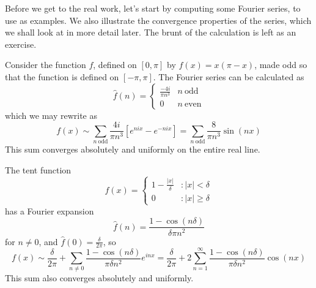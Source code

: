 Before we get to the real work, let's start by computing some Fourier series, to use as examples. We also illustrate the convergence properties of the series, which we shall look at in more detail later. The brunt of the calculation is left as an exercise.

\begin{example}
    Consider the function $f$, defined on $[0,\pi]$ by $f(x) = x(\pi - x)$, made odd so that the function is defined on $[-\pi,\pi]$. The Fourier series can be calculated as
    \[ \hat{f}(n) = \begin{cases} \frac{-4i}{\pi n^3} & n\ \text{odd} \\ 0 & n\ \text{even} \end{cases} \]
    which we may rewrite as
    \[ f(x) \sim \sum_{n\ \text{odd}} \frac{4i}{\pi n^3} [e^{nix} - e^{-nix}] = \sum_{n\ \text{odd}} \frac{8}{\pi n^3} \sin(nx) \]
    This sum converges absolutely and uniformly on the entire real line.
\end{example}

\begin{example}
    The tent function
    \[ f(x) = \begin{cases} 1 - \frac{|x|}{\delta} & : |x| < \delta \\ 0 & : |x| \geq \delta \end{cases} \]
    has a Fourier expansion
    \[ \hat{f}(n) = \frac{1 - \cos(n\delta)}{\delta \pi n^2} \]
    for $n \neq 0$, and $\hat{f}(0) = \frac{\delta}{2\pi}$, so
    \[ f(x) \sim \frac{\delta}{2\pi} + \sum_{n \neq 0} \frac{1 - \cos(n\delta)}{\pi \delta n^2} e^{inx} = \frac{\delta}{2 \pi} + 2 \sum_{n = 1}^\infty \frac{1 - \cos(n\delta)}{\pi \delta n^2} \cos(nx) \]
    This sum also converges absolutely and uniformly.
\end{example}

